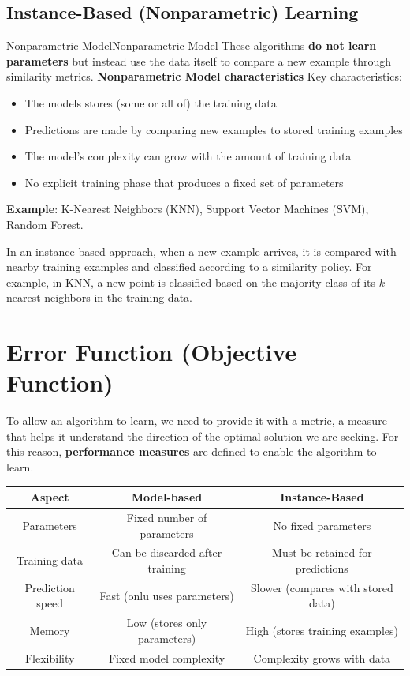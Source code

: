 \documentclass[a4paper]{article}
\theoremstyle{definition}
\begin{document}
\subsection{Instance-Based (Nonparametric) Learning}
\begin{definition}{Nonparametric Model}{Nonparametric Model}
These algorithms \textbf{do not learn parameters} but instead use the data itself to compare a new example 
through similarity metrics.
\vspace{1em}
\noindent
\newline
\textbf{Nonparametric Model characteristics} 
\vspace{1em}
\noindent
\newline
Key characteristics:
\begin{itemize}
    \item The models stores (some or all of) the training data
    \item Predictions are made by comparing new examples to stored training examples 
    \item The model's complexity can grow with the amount of training data
    \item No explicit training phase that produces a fixed set of parameters
\end{itemize}
\textbf{Example}: K-Nearest Neighbors (KNN), Support Vector Machines (SVM), Random Forest.
\end{definition}
In an instance-based approach, when a new example arrives, it is compared with nearby training 
examples and classified according to a similarity policy. For example, in KNN, a new point is 
classified based on the majority class of its \( k \) nearest neighbors in the training data.
\section{Error Function (Objective Function)}
To allow an algorithm to learn, we need to provide it with a metric, a measure that helps it understand the direction of the optimal solution we are 
seeking. For this reason, \textbf{performance measures} are defined to enable the algorithm to learn.
\begin{center}
    \begin{tabular}{ |c|c|c| }
        \hline 
        \textbf{Aspect} & \textbf{Model-based} & \textbf{Instance-Based} \\
        \hline 
        Parameters & Fixed number of parameters & No fixed parameters \\
        \hline 
        Training data & Can be discarded after training & Must be retained for predictions \\
        \hline
        Prediction speed & Fast (onlu uses parameters) & Slower (compares with stored data) \\
        \hline 
        Memory & Low (stores only parameters) & High (stores training examples) \\
        \hline 
        Flexibility & Fixed model complexity & Complexity grows with data \\
        \hline
    \end{tabular}
\end{center}
\end{document}
